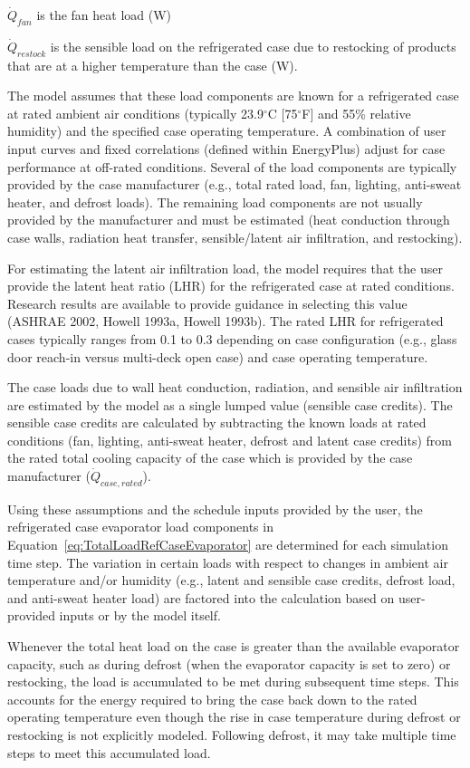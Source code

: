 \({\dot Q_{fan}}\) is the fan heat load (W)

\({\dot Q_{restock}}\) is the sensible load on the refrigerated case due to restocking of products that are at a higher temperature than the case (W).

The model assumes that these load components are known for a refrigerated case at rated ambient air conditions (typically 23.9\(^{\circ}\)C {[}75\(^{\circ}\)F{]} and 55\% relative humidity) and the specified case operating temperature. A combination of user input curves and fixed correlations (defined within EnergyPlus) adjust for case performance at off-rated conditions. Several of the load components are typically provided by the case manufacturer (e.g., total rated load, fan, lighting, anti-sweat heater, and defrost loads). The remaining load components are not usually provided by the manufacturer and must be estimated (heat conduction through case walls, radiation heat transfer, sensible/latent air infiltration, and restocking).

For estimating the latent air infiltration load, the model requires that the user provide the latent heat ratio (LHR) for the refrigerated case at rated conditions. Research results are available to provide guidance in selecting this value (ASHRAE 2002, Howell 1993a, Howell 1993b). The rated LHR for refrigerated cases typically ranges from 0.1 to 0.3 depending on case configuration (e.g., glass door reach-in versus multi-deck open case) and case operating temperature.

The case loads due to wall heat conduction, radiation, and sensible air infiltration are estimated by the model as a single lumped value (sensible case credits). The sensible case credits are calculated by subtracting the known loads at rated conditions (fan, lighting, anti-sweat heater, defrost and latent case credits) from the rated total cooling capacity of the case which is provided by the case manufacturer (\({\dot Q_{case,rated}}\)).

Using these assumptions and the schedule inputs provided by the user, the refrigerated case evaporator load components in Equation~\ref{eq:TotalLoadRefCaseEvaporator} are determined for each simulation time step. The variation in certain loads with respect to changes in ambient air temperature and/or humidity (e.g., latent and sensible case credits, defrost load, and anti-sweat heater load) are factored into the calculation based on user-provided inputs or by the model itself.

Whenever the total heat load on the case is greater than the available evaporator capacity, such as during defrost (when the evaporator capacity is set to zero) or restocking, the load is accumulated to be met during subsequent time steps. This accounts for the energy required to bring the case back down to the rated operating temperature even though the rise in case temperature during defrost or restocking is not explicitly modeled. Following defrost, it may take multiple time steps to meet this accumulated load.

